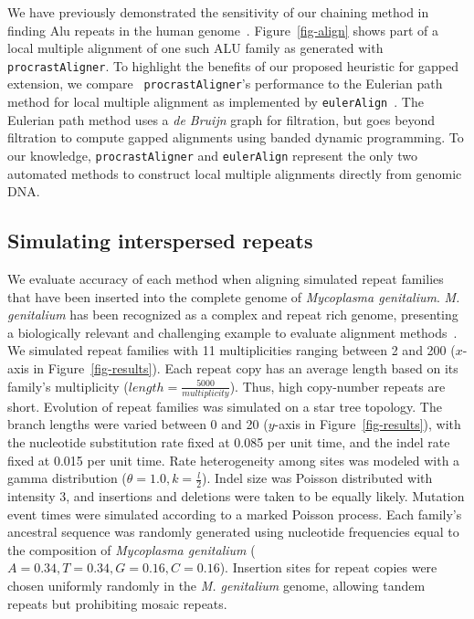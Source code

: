\documentclass{ws-procs975x65}
\begin{document}
We have previously demonstrated the sensitivity of our chaining method in finding Alu repeats in
the human genome~\cite{ref-procrast}. Figure~\ref{fig-align} shows part of a  local multiple alignment of one such ALU family as generated with \texttt{procrastAligner}. To highlight the benefits of our proposed heuristic for gapped extension, we compare ~\texttt{procrastAligner}'s performance to the Eulerian path method for local multiple alignment as implemented by \texttt{eulerAlign}~\cite{ref-related1}. The Eulerian path method uses
a \textit{de Bruijn} graph for filtration, but goes beyond filtration to compute gapped alignments using banded dynamic
programming.  To our knowledge, \texttt{procrastAligner} and \texttt{eulerAlign} represent the only two automated methods to construct local multiple alignments directly from genomic DNA.

\subsection{Simulating interspersed repeats}
We evaluate accuracy of each method when aligning simulated repeat families that have been inserted into the complete genome of \emph{Mycoplasma genitalium}. \emph{M. genitalium} has been recognized as a complex and repeat rich genome, presenting a biologically relevant and challenging example to evaluate alignment methods~\cite{ref-mycoplasma}. We simulated repeat families with 11 multiplicities ranging between 2 and 200 ($x$-axis in Figure~\ref{fig-results}).  Each repeat copy has an average length based on its family's multiplicity ($length=\frac{5000}{multiplicity}$).  Thus, high copy-number repeats are short.  Evolution of repeat families was simulated on a star tree topology.  The branch lengths were varied between 0 and 20 ($y$-axis in Figure~\ref{fig-results}), with the nucleotide substitution rate fixed at 0.085 per unit time, and the indel rate fixed at 0.015 per unit time.  Rate heterogeneity among sites was modeled with a gamma distribution ($\theta = 1.0, k = \frac{l}{2}$).  Indel size was Poisson distributed with intensity 3, and insertions and deletions were taken to be equally likely.  Mutation event times were simulated according to a marked Poisson process.  Each family's ancestral sequence was randomly generated using nucleotide frequencies equal to the composition of \emph{Mycoplasma genitalium} ($A=0.34,T=0.34,G=0.16,C=0.16$). Insertion sites for repeat copies were chosen uniformly randomly in the \textit{M. genitalium} genome, allowing tandem repeats but prohibiting mosaic repeats.
\end{document}
